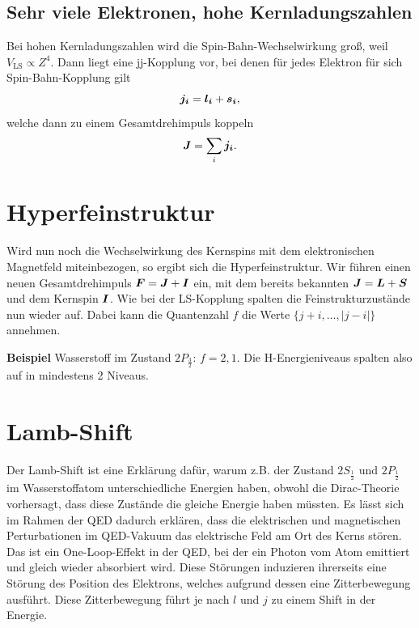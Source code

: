 \subsection{Sehr viele Elektronen, hohe Kernladungszahlen}
Bei hohen Kernladungszahlen wird die Spin-Bahn-Wechselwirkung groß, weil $V_\text{LS}\propto Z^4$.
Dann liegt eine jj-Kopplung vor, bei denen für jedes Elektron für sich Spin-Bahn-Kopplung gilt
\begin{equation*}
	\boldsymbol{j_i} = \boldsymbol{l_i} + \boldsymbol{s_i},
\end{equation*}
welche dann zu einem Gesamtdrehimpuls koppeln
\begin{equation*}
 \boldsymbol{J} = \sum_i\boldsymbol{j_i}.
\end{equation*}

\section{Hyperfeinstruktur}
Wird nun noch die Wechselwirkung des Kernspins mit dem elektronischen Magnetfeld miteinbezogen, so ergibt sich die Hyperfeinstruktur.
Wir führen einen neuen Gesamtdrehimpuls $\boldsymbol{F} = \boldsymbol{J} + \boldsymbol{I}$ ein, mit dem bereits bekannten $\boldsymbol{J} = \boldsymbol{L} + \boldsymbol{S}$ und dem Kernspin $\boldsymbol{I}$.
Wie bei der LS-Kopplung spalten die Feinstrukturzustände nun wieder auf.
Dabei kann die Quantenzahl $f$ die Werte $\{j+i,\dots,|j-i|\}$ annehmen.

\textbf{Beispiel}  Wasserstoff im Zustand $2P_\frac{3}{2}$: $f=2,1$.
Die H-Energieniveaus spalten also auf in mindestens 2 Niveaus.

\section{Lamb-Shift}
Der Lamb-Shift ist eine Erklärung dafür, warum z.B. der Zustand $2S_\frac{1}{2}$ und $2P_\frac{1}{2}$ im Wasserstoffatom unterschiedliche Energien haben, obwohl die Dirac-Theorie vorhersagt, dass diese Zustände die gleiche Energie haben müssten.
Es lässt sich im Rahmen der QED dadurch erklären, dass die elektrischen und magnetischen Perturbationen im QED-Vakuum das elektrische Feld am Ort des Kerns stören.
Das ist ein One-Loop-Effekt in der QED, bei der ein Photon vom Atom emittiert und gleich wieder absorbiert wird.
Diese Störungen induzieren ihrerseits eine Störung des Position des Elektrons, welches aufgrund dessen eine Zitterbewegung ausführt.
Diese Zitterbewegung führt je nach $l$ und $j$ zu einem Shift in der Energie.

